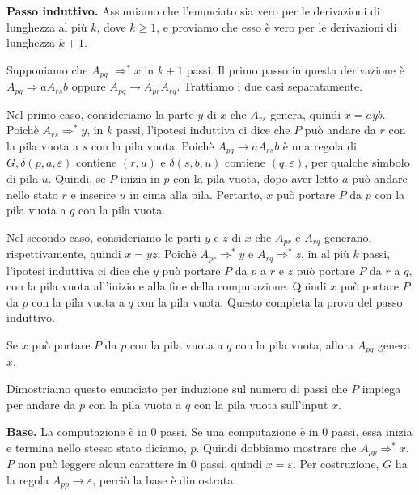 \documentclass{article}
\begin{document}
\textbf{Passo induttivo.}
Assumiamo che l'enunciato sia vero per le derivazioni di lunghezza al più $k$, dove $k \geq 1$, e proviamo che esso è vero per le derivazioni di lunghezza $k+1$.

Supponiamo che $A_{pq}$ $\Rightarrow^{*} x$ in $k+1$ passi.
Il primo passo in questa derivazione è $A_{pq} \Rightarrow aA_{rs}b$ oppure $A_{pq} \rightarrow A_{pr}A_{rq}$.
Trattiamo i due casi separatamente.

Nel primo caso, consideriamo la parte $y$ di $x$ che $A_{rs}$ genera, quindi $x = ayb$.
Poichè $A_{rs} \Rightarrow^{*} y$, in $k$ passi, l'ipotesi induttiva ci dice che $P$ può andare da $r$ con la pila vuota a $s$ con la pila vuota.
Poichè $A_{pq} \rightarrow aA_{rs}b$ è una regola di $G, \delta(p,a,\varepsilon)$ contiene $(r,u)$ e $\delta(s,b,u)$ contiene $(q,\varepsilon)$, per qualche simbolo di pila $u$.
Quindi, se $P$ inizia in $p$ con la pila vuota, dopo aver letto $a$ può andare nello stato $r$ e inserire $u$ in cima alla pila.
Pertanto, $x$ può portare $P$ da $p$ con la pila vuota a $q$ con la pila vuota.

Nel secondo caso, consideriamo le parti $y$ e $z$ di $x$ che $A_{pr}$ e $A_{rq}$ generano, rispettivamente, quindi $x = yz$.
Poichè $A_{pr} \Rightarrow^{*} y$ e $A_{rq} \Rightarrow^{*} z$, in al più $k$ passi, l'ipotesi induttiva ci dice che $y$ può portare $P$ da $p$ a $r$ e $z$ può portare $P$ da $r$ a $q$, con la pila vuota all'inizio e alla fine della computazione.
Quindi $x$ può portare $P$ da $p$ con la pila vuota a $q$ con la pila vuota.
Questo completa la prova del passo induttivo.

\begin{tcolorbox}[colback=yellow!10!white, colframe=yellow!50!black, title=Fatto 2.31]
    Se $x$ può portare $P$ da $p$ con la pila vuota a $q$ con la pila vuota, allora $A_{pq}$ genera $x$.
\end{tcolorbox}

Dimostriamo questo enunciato per induzione sul numero di passi che $P$ impiega per andare da $p$ con la pila vuota a $q$ con la pila vuota sull'input $x$.
\vspace{1em}

\textbf{Base.}
La computazione è in 0 passi.
Se una computazione è in 0 passi, essa inizia e termina nello stesso stato diciamo, $p$. 
Quindi dobbiamo mostrare che $A_{pp} \Rightarrow^{*} x$. 
$P$ non può leggere alcun carattere in 0 passi, quindi $x = \varepsilon$. 
Per costruzione, $G$ ha la regola $A_{pp} \rightarrow \varepsilon$, perciò la base è dimostrata.
\end{document}
